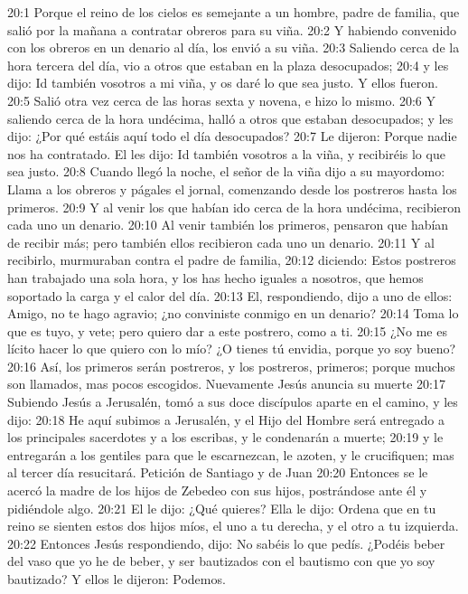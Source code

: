 20:1 Porque el reino de los cielos es semejante a un hombre, padre de familia, que salió por la mañana a contratar obreros para su viña. 
20:2 Y habiendo convenido con los obreros en un denario al día, los envió a su viña. 
20:3 Saliendo cerca de la hora tercera del día, vio a otros que estaban en la plaza desocupados; 
20:4 y les dijo: Id también vosotros a mi viña, y os daré lo que sea justo. Y ellos fueron. 
20:5 Salió otra vez cerca de las horas sexta y novena, e hizo lo mismo. 
20:6 Y saliendo cerca de la hora undécima, halló a otros que estaban desocupados; y les dijo: ¿Por qué estáis aquí todo el día desocupados? 
20:7 Le dijeron: Porque nadie nos ha contratado. El les dijo: Id también vosotros a la viña, y recibiréis lo que sea justo. 
20:8 Cuando llegó la noche, el señor de la viña dijo a su mayordomo: Llama a los obreros y págales el jornal, comenzando desde los postreros hasta los primeros. 
20:9 Y al venir los que habían ido cerca de la hora undécima, recibieron cada uno un denario. 
20:10 Al venir también los primeros, pensaron que habían de recibir más; pero también ellos recibieron cada uno un denario. 
20:11 Y al recibirlo, murmuraban contra el padre de familia, 
20:12 diciendo: Estos postreros han trabajado una sola hora, y los has hecho iguales a nosotros, que hemos soportado la carga y el calor del día. 
20:13 El, respondiendo, dijo a uno de ellos: Amigo, no te hago agravio; ¿no conviniste conmigo en un denario? 
20:14 Toma lo que es tuyo, y vete; pero quiero dar a este postrero, como a ti. 
20:15 ¿No me es lícito hacer lo que quiero con lo mío? ¿O tienes tú envidia, porque yo soy bueno? 
20:16 Así, los primeros serán postreros, y los postreros, primeros; porque muchos son llamados, mas pocos escogidos. 
Nuevamente Jesús anuncia su muerte  
20:17 Subiendo Jesús a Jerusalén, tomó a sus doce discípulos aparte en el camino, y les dijo: 
20:18 He aquí subimos a Jerusalén, y el Hijo del Hombre será entregado a los principales sacerdotes y a los escribas, y le condenarán a muerte; 
20:19 y le entregarán a los gentiles para que le escarnezcan, le azoten, y le crucifiquen; mas al tercer día resucitará. 
Petición de Santiago y de Juan  
20:20 Entonces se le acercó la madre de los hijos de Zebedeo con sus hijos, postrándose ante él y pidiéndole algo. 
20:21 El le dijo: ¿Qué quieres? Ella le dijo: Ordena que en tu reino se sienten estos dos hijos míos, el uno a tu derecha, y el otro a tu izquierda. 
20:22 Entonces Jesús respondiendo, dijo: No sabéis lo que pedís. ¿Podéis beber del vaso que yo he de beber, y ser bautizados con el bautismo con que yo soy bautizado? Y ellos le dijeron: Podemos. 
